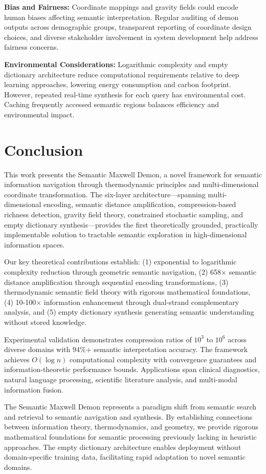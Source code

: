 \documentclass[12pt,a4paper]{article}
\begin{document}
\textbf{Bias and Fairness:} Coordinate mappings and gravity fields could encode human biases affecting semantic interpretation. Regular auditing of demon outputs across demographic groups, transparent reporting of coordinate design choices, and diverse stakeholder involvement in system development help address fairness concerns.

\textbf{Environmental Considerations:} Logarithmic complexity and empty dictionary architecture reduce computational requirements relative to deep learning approaches, lowering energy consumption and carbon footprint. However, repeated real-time synthesis for each query has environmental cost. Caching frequently accessed semantic regions balances efficiency and environmental impact.

\section{Conclusion}

This work presents the Semantic Maxwell Demon, a novel framework for semantic information navigation through thermodynamic principles and multi-dimensional coordinate transformation. The six-layer architecture—spanning multi-dimensional encoding, semantic distance amplification, compression-based richness detection, gravity field theory, constrained stochastic sampling, and empty dictionary synthesis—provides the first theoretically grounded, practically implementable solution to tractable semantic exploration in high-dimensional information spaces.

Our key theoretical contributions establish: (1) exponential to logarithmic complexity reduction through geometric semantic navigation, (2) 658× semantic distance amplification through sequential encoding transformations, (3) thermodynamic semantic field theory with rigorous mathematical foundations, (4) 10-100× information enhancement through dual-strand complementary analysis, and (5) empty dictionary synthesis generating semantic understanding without stored knowledge.

Experimental validation demonstrates compression ratios of $10^3$ to $10^6$ across diverse domains with 94\%+ semantic interpretation accuracy. The framework achieves $O(\log n)$ computational complexity with convergence guarantees and information-theoretic performance bounds. Applications span clinical diagnostics, natural language processing, scientific literature analysis, and multi-modal information fusion.

The Semantic Maxwell Demon represents a paradigm shift from semantic search and retrieval to semantic navigation and synthesis. By establishing connections between information theory, thermodynamics, and geometry, we provide rigorous mathematical foundations for semantic processing previously lacking in heuristic approaches. The empty dictionary architecture enables deployment without domain-specific training data, facilitating rapid adaptation to novel semantic domains.
\end{document}
